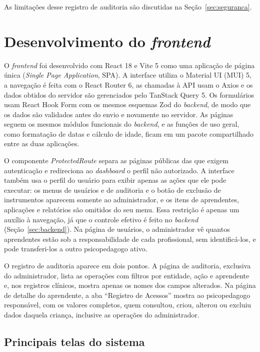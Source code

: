 As limitações desse registro de auditoria são discutidas na Seção~\ref{sec:seguranca}.

\section{Desenvolvimento do \textit{frontend}}\label{sec:frontend}

O \textit{frontend} foi desenvolvido com React 18 e Vite 5 como uma aplicação de página única (\textit{Single Page Application}, SPA). A interface utiliza o Material UI (MUI) 5, a navegação é feita com o React Router 6, as chamadas à API usam o Axios e os dados obtidos do servidor são gerenciados pelo TanStack Query 5. Os formulários usam React Hook Form com os mesmos esquemas Zod do \textit{backend}, de modo que os dados são validados antes do envio e novamente no servidor. As páginas seguem os mesmos módulos funcionais do \textit{backend}, e as funções de uso geral, como formatação de datas e cálculo de idade, ficam em um pacote compartilhado entre as duas aplicações.

O componente \textit{ProtectedRoute} separa as páginas públicas das que exigem autenticação e redireciona ao \textit{dashboard} o perfil não autorizado. A interface também usa o perfil do usuário para exibir apenas as ações que ele pode executar: os menus de usuários e de auditoria e o botão de exclusão de instrumentos aparecem somente ao administrador, e os itens de aprendentes, aplicações e relatórios são omitidos do seu menu. Essa restrição é apenas um auxílio à navegação, já que o controle efetivo é feito no \textit{backend} (Seção~\ref{sec:backend}). Na página de usuários, o administrador vê quantos aprendentes estão sob a responsabilidade de cada profissional, sem identificá-los, e pode transferi-los a outro psicopedagogo ativo.

O registro de auditoria aparece em dois pontos. A página de auditoria, exclusiva do administrador, lista as operações com filtros por entidade, ação e aprendente e, nos registros clínicos, mostra apenas os nomes dos campos alterados. Na página de detalhe do aprendente, a aba ``Registro de Acessos'' mostra ao psicopedagogo responsável, com os valores completos, quem consultou, criou, alterou ou excluiu dados daquela criança, inclusive as operações do administrador.

\subsection{Principais telas do sistema}\label{sec:telas}

